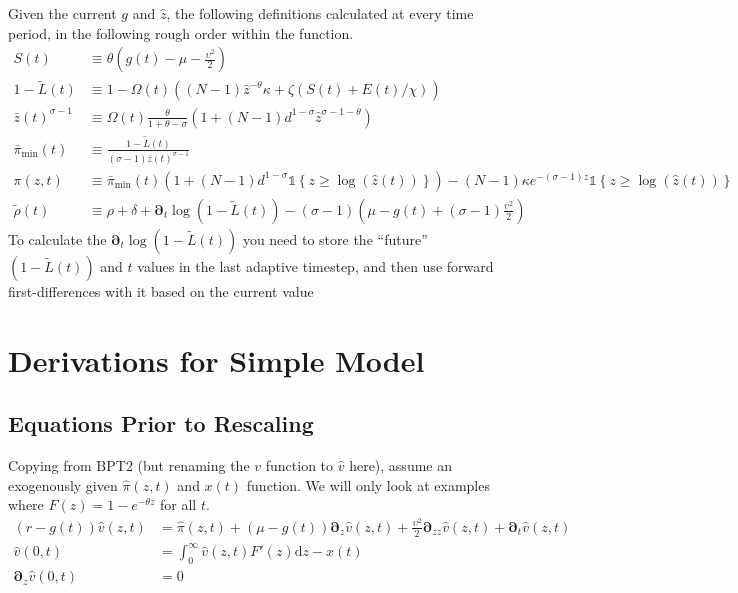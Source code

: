 \documentclass[11pt]{article}
\newcommand{\D}[1][]{\ensuremath{\boldsymbol{\partial}_{#1}}}
\newcommand{\diff}{\ensuremath{\mathrm{d}}}
\newcommand{\indicator}[1]{\ensuremath{\mathds{1}\left\{{#1}\right\}}}
\begin{document}
Given the current $g$ and $\hat{z}$, the following definitions calculated at every time period, in the following rough order within the function.
\begin{align}
	S(t) &\equiv \theta \left( g(t) - \mu - \frac{\upsilon^2}{2}\right)\\
	1 - \tilde{L}(t) &\equiv 1 - \Omega(t)\left((N -1)\hat{z}^{-\theta}\kappa + \zeta \left(S(t) + E(t)/\chi \right)\right)\\
	\bar{z}(t)^{\sigma - 1}&\equiv \Omega(t)
\frac{\theta}{1+\theta - \sigma}\left(1 + (N-1)d^{1-\sigma}\hat{z}^{\sigma - 1 -\theta} \right)\label{eq:z-bar-sub-power}\\
	\bar{\pi}_{\min}(t) &\equiv \frac{1-\tilde{L}(t)}{(\sigma-1)\bar{z}(t)^{\sigma-1}}\label{eq:pi-min-def}\\
	\pi(z,t) &\equiv \bar{\pi}_{\min}(t)\left(1 + (N-1)d^{1-\sigma}\indicator{z \geq \log(\hat{z}(t))}\right) - (N-1)\kappa e^{-(\sigma - 1)z}\indicator{z \geq \log(\hat{z}(t))}\\
	\tilde{\rho}(t) &\equiv \rho+ \delta + \D[t]\log\left(1 - \tilde{L}(t)\right) - (\sigma - 1)\left(\mu - g(t) + (\sigma - 1)\frac{\upsilon^2}{2} \right)\label{eq:rhot}
\end{align}
To calculate the $\D[t]\log\left(1 - \tilde{L}(t)\right)$ you need to store the ``future'' $\left(1 - \tilde{L}(t)\right)$ and $t$ values in the last adaptive timestep, and then use forward first-differences with it based on the current value

\newpage
\appendix
\makeatletter
\def\@seccntformat#1{Appendix\ \csname the#1\endcsname\quad}
\makeatother
\makeatletter
\def\@seccntformat#1{\csname Pref@#1\endcsname \csname the#1\endcsname\quad}
\def\Pref@section{Appendix~}
\makeatother
{}
\section{Derivations for Simple Model}\label{sec:simple-derivation}
\subsection{Equations Prior to Rescaling}

Copying from BPT2 (but renaming the $v$ function to $\hat{v}$ here), assume an exogenously given $\hat{\pi}(z,t)$ and $x(t)$ function.  We will only look at examples where $F(z) = 1 - e^{-\theta z}$ for all $t$.
\begin{align}
(r - g(t)) \hat{v}(z,t) &= \hat{\pi}(z,t) + (\mu- g(t)) \D[z] \hat{v}(z,t) + \frac{\upsilon^2}{2} \D[zz] \hat{v}(z,t) + \D[t]\hat{v}(z,t)\label{eq:bellman-GBM-dynamic}	\\
\hat{v}(0,t) &= \int_{0}^{\infty} \hat{v}(z,t) F'(z)\diff z - x(t)\label{eq:vm-GBM-dynamic}\\
\D[z]\hat{v}(0,t) &= 0\label{eq:sp-GBM-dynamic}
\end{align}
\end{document}
